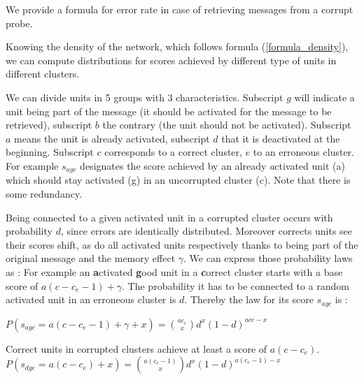 \documentclass[english,10pt,twocolumn]{IEEEtran}
\theoremstyle{definition}
\begin{document}
	We provide a formula for error rate in case of retrieving messages from a corrupt probe.

	
	Knowing the density of the network, which follows formula (\ref{formula_density}), we can compute distributions for scores achieved by different type of units in different clusters.
	
	We can divide units in 5 groups with 3 characteristics. Subscript $g$ will indicate a unit being part of the message (it should be activated for the message to be retrieved), subscript $b$ the contrary (the unit should not be activated). Subscript $a$ means the unit is already activated, subscript $d$ that it is deactivated at the beginning. Subscript $c$ corresponds to a correct cluster, $e$ to an erroneous cluster. For example $s_{agc}$ designates the score achieved by an already \emph{a}ctivated unit (a) which should stay activated (g) in an uncorrupted cluster (c). Note that there is some redundancy.
	
	Being connected to a given activated unit in a corrupted cluster occurs with probability $d$, since errors are identically distributed. Moreover corrects units see their scores shift, as do all activated units respectively thanks to being part of the original message and the memory effect $\gamma$. We can express those probability laws as : 
	For example an \textbf{a}ctivated \textbf{g}ood unit in a \textbf{c}orrect cluster starts with a base score of $ a(c - c_e - 1) + \gamma$. The probability it has to be connected to a random activated unit in an erroneous cluster is $d$. Thereby the law for its score $s_{agc}$ is :
	
	$P(s_{agc} = a(c - c_e - 1) + \gamma + x) = {a c_e \choose x} d^x (1-d)^{a ce-x}$
	
	Correct units in corrupted clusters achieve at least a score of $a(c - c_e)$. 
	$P(s_{dge} = a(c - c_e) + x) = {a (c_e - 1) \choose x} d^x (1-d)^{a (c_e - 1)-x}$
	
	
\end{document}
